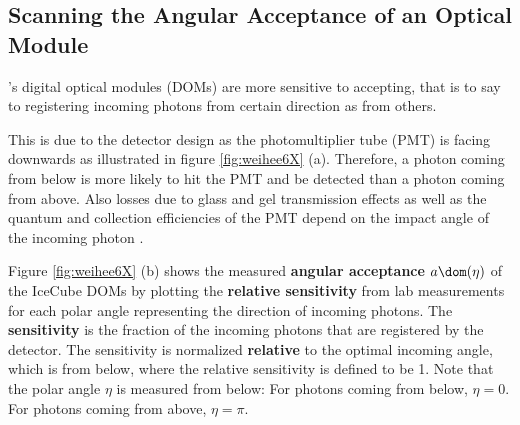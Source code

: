 
\subsection{Scanning the Angular Acceptance of an Optical Module}
\label{sec:angular_acceptance_scan}

\icecube's digital optical modules (DOMs) are more sensitive to accepting, that is to say to registering incoming photons from certain direction as from others.

This is due to the detector design as the photomultiplier tube (PMT) is facing downwards as illustrated in figure \ref{fig:weihee6X} (a). Therefore, a photon coming from below is more likely to hit the PMT and be detected than a photon coming from above. Also losses due to glass and gel transmission effects as well as the quantum and collection efficiencies of the PMT depend on the impact angle of the incoming photon \cite{icepaper}.


Figure \ref{fig:weihee6X} (b) shows the measured \textbf{angular acceptance} $a\dom(\eta)$ of the IceCube DOMs by plotting the \textbf{relative sensitivity} from lab measurements for each polar angle representing the direction of incoming photons. \cite{icepaper} The \textbf{sensitivity} is the fraction of the incoming photons that are registered by the detector. The sensitivity is normalized \textbf{relative} to the optimal incoming angle, which is from below, where the relative sensitivity is defined to be 1. Note that the polar angle $\eta$ is measured from below: For photons coming from below, $\eta = 0$. For photons coming from above, $\eta = \pi$.


